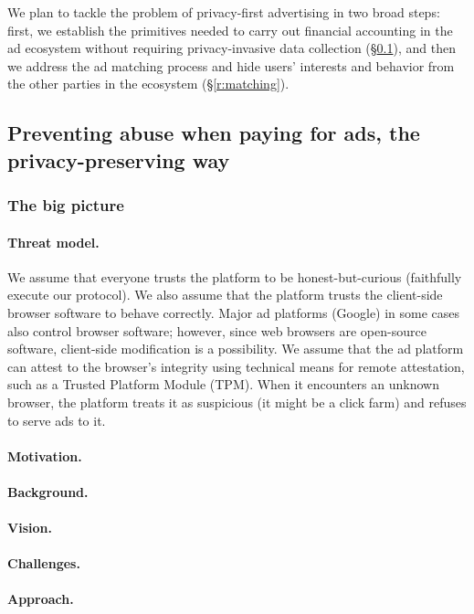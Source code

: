 


%
We plan to tackle the problem of privacy-first advertising in two broad steps:
first, we establish the primitives needed to carry out financial accounting in
the ad ecosystem without requiring privacy-invasive data
collection (\S\ref{r:fraud}), and then we address the ad matching process and
hide users' interests and behavior from the other parties in the ecosystem
(\S\ref{r:matching}).
%

\subsection{Preventing abuse when paying for ads, the privacy-preserving way}
\label{r:fraud}

\subsubsection{The big picture}

\paragraph{Threat model.}
%
We assume that everyone trusts the platform to be honest-but-curious (\ie faithfully execute our protocol). 
%
We also assume that the platform trusts the client-side browser software to behave correctly.
%
Major ad platforms (\eg Google) in some cases also control browser software; however, since web browsers are open-source software, client-side modification is a possibility.
%
We assume that the ad platform can attest to the browser's integrity using technical means for remote attestation, such as a Trusted Platform Module (TPM).
%
When it encounters an unknown browser, the platform treats it as suspicious (\ie it might be a click farm) and refuses to serve ads to it.
%



\paragraph{Motivation.}

\paragraph{Background.}

\paragraph{Vision.}

\paragraph{Challenges.}

\paragraph{Approach.}
